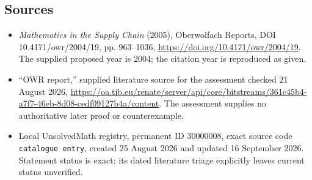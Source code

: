 \documentclass[11pt]{article}
\begin{document}
\subsection{Sources}
\begin{itemize}
\item \emph{Mathematics in the Supply Chain} (2005), Oberwolfach Reports, DOI 10.4171/owr/2004/19, pp. 963--1036, \url{https://doi.org/10.4171/owr/2004/19}. The supplied proposed year is 2004; the citation year is reproduced as given.
\item ``OWR report,'' supplied literature source for the assessment checked 21 August 2026, \url{https://oa.tib.eu/renate/server/api/core/bitstreams/361c45b4-a7f7-46eb-8d08-cedf09127b4a/content}. The assessment supplies no authoritative later proof or counterexample.
\item Local UnsolvedMath registry, permanent ID $30000008$, exact source code \texttt{catalogue entry}, created 25 August 2026 and updated 16 September 2026. Statement status is exact; its dated literature triage explicitly leaves current status unverified.
\end{itemize}
\end{document}
